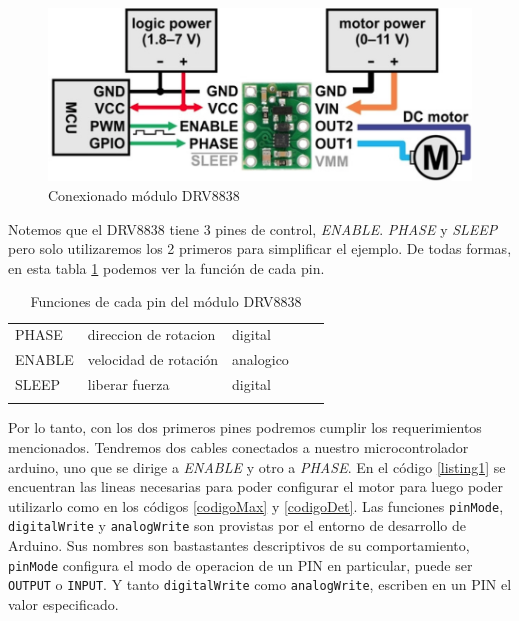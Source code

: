 \begin{figure}[h]
    \centering
    \includegraphics[width=0.65\linewidth]{drv8838.png}
    \caption{Conexionado módulo DRV8838}
    \label{drv8838}
\end{figure}

Notemos que el \gls{DRV8838} tiene 3 pines de control, \textit{ENABLE}. \textit{PHASE} y \textit{SLEEP} pero solo utilizaremos los 2 primeros para simplificar el ejemplo. De todas formas, en esta tabla \ref{funciones_pin_drv8838} podemos ver la función de cada pin.


\begin{table}[h]
\centering
\begin{tabular}{lllll}
\cline{1-3}
\multicolumn{1}{|l|}{PHASE}  & \multicolumn{1}{l|}{direccion de rotacion} & \multicolumn{1}{l|}{digital}   &  &  \\ \cline{1-3}
\multicolumn{1}{|l|}{ENABLE} & \multicolumn{1}{l|}{velocidad de rotación} & \multicolumn{1}{l|}{analogico} &  &  \\ \cline{1-3}
\multicolumn{1}{|l|}{SLEEP}  & \multicolumn{1}{l|}{liberar fuerza}        & \multicolumn{1}{l|}{digital}   &  &  \\ \cline{1-3}
                             &                                            &                                &  & 
\end{tabular}
\caption{Funciones de cada pin del módulo DRV8838}
\label{funciones_pin_drv8838}
\end{table}

Por lo tanto, con los dos primeros pines podremos cumplir los requerimientos mencionados. Tendremos dos cables conectados a nuestro \gls{microcontrolador} \gls{arduino}, uno que se dirige a \textit{ENABLE} y otro a \textit{PHASE}. En el código \ref{listing1} se encuentran las lineas necesarias para poder configurar el motor para luego poder utilizarlo como en los códigos \ref{codigoMax} y \ref{codigoDet}. Las funciones \verb|pinMode|, \verb|digitalWrite| y \verb|analogWrite| son provistas por el entorno de desarrollo de Arduino. Sus nombres son bastastantes descriptivos de su comportamiento, \verb|pinMode| configura el modo de operacion de un PIN en particular, puede ser \verb|OUTPUT| o \verb|INPUT|. Y tanto \verb|digitalWrite| como \verb|analogWrite|, escriben en un PIN el valor especificado.

